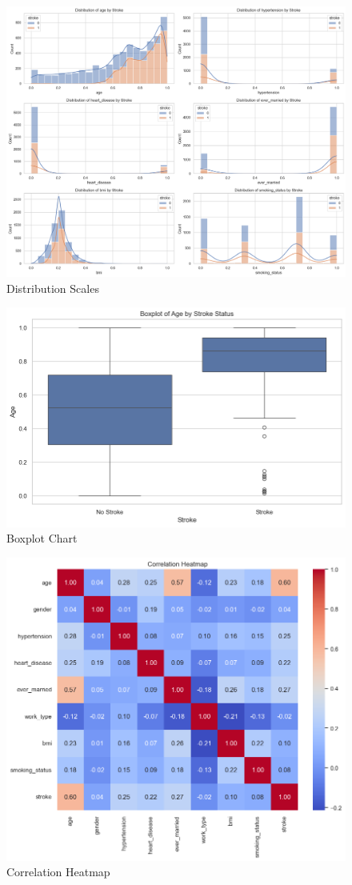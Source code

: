 \documentclass[runningheads]{llncs}
\begin{document}
\begin{enumerate}
\begin{figure}
    \centering
    \includegraphics[width=.8\linewidth]{eda1.png}
    \caption{Distribution Scales} 
    \label{fig:enter-label}
\end{figure}

\begin{figure}
    \centering
    \includegraphics[width=.8\linewidth]{eda2.png}
    \caption{Boxplot Chart} 
    \label{fig:enter-label}
\end{figure}

\begin{figure}
    \centering
    \includegraphics[width=.8\linewidth]{eda3.png}
    \caption{Correlation Heatmap} 
    \label{fig:enter-label}
\end{figure}


\end{enumerate}
\end{document}
